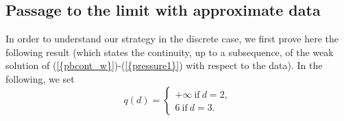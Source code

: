 \documentclass{amsart}
\numberwithin{equation}{section}
\begin{document}
\subsection{Passage to the limit with approximate data}

In order to understand our strategy in the discrete case,
we first prove here the following result (which states the continuity, up to a subsequence, of the weak solution of {(\ref{{pbcont_w}})}-{(\ref{{pressure1}})}
with respect to the data). In the following, we set
\begin{equation*} q(d)= \left\{
\begin{array}{l}
  +\infty \ \text{if} \ d=2, \\
 6 \ \text{if} \ d=3.
\end{array}
\right.
\end{equation*}
\end{document}
